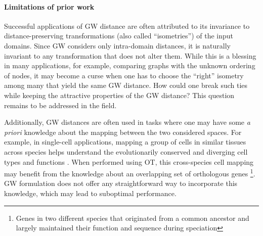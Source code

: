 \paragraph{Limitations of prior work} Successful applications of GW distance are often attributed to its invariance to distance-preserving transformations (also called ``isometries'') of the input domains. Since GW considers only intra-domain distances, it is naturally invariant to any transformation that does not alter them. While this is a blessing in many applications, for example, comparing graphs with the unknown ordering of nodes, it may become a curse when one has to choose the ``right'' isometry among many that yield the same GW distance. How could one break such ties while keeping the attractive properties of the GW distance? This question remains to be addressed in the field.

Additionally, GW distances are often used in tasks where one may have some
\textit{a priori} knowledge about the mapping between the two considered spaces.
For example, in single-cell applications, mapping a group of cells in similar tissues
across species helps understand the evolutionarily conserved and diverging cell types
and functions \citep{kriebel2022uinmf}. When performed using OT, this cross-species cell mapping
may benefit from the knowledge about an overlapping set of orthologous genes
\footnote {Genes in two different species that originated from a common ancestor and
largely maintained their function and sequence during speciation}.
GW formulation does not offer any straightforward way to incorporate this knowledge,
which may lead to suboptimal performance.


